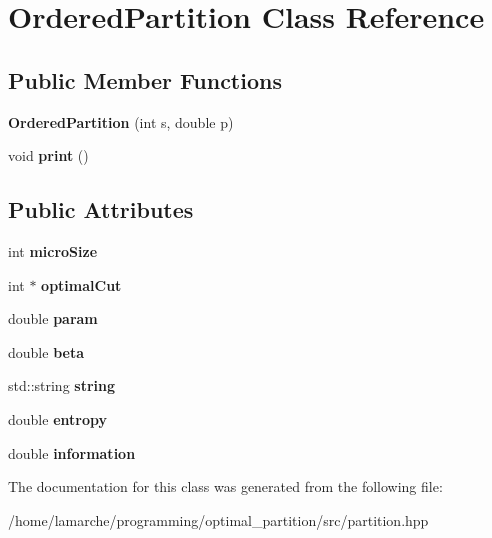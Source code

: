 \hypertarget{classOrderedPartition}{\section{Ordered\-Partition Class Reference}
\label{classOrderedPartition}
}
\subsection*{Public Member Functions}
\begin{DoxyCompactItemize}
\item 
\hypertarget{classOrderedPartition_aabf4e3ee7ddd8279efd1d30f13844dbf}{{\bfseries Ordered\-Partition} (int s, double p)}\label{classOrderedPartition_aabf4e3ee7ddd8279efd1d30f13844dbf}

\item 
\hypertarget{classOrderedPartition_ad62349b410a52274043a328dafb13342}{void {\bfseries print} ()}\label{classOrderedPartition_ad62349b410a52274043a328dafb13342}

\end{DoxyCompactItemize}
\subsection*{Public Attributes}
\begin{DoxyCompactItemize}
\item 
\hypertarget{classOrderedPartition_ac4e60b2ef3d286b496d3274f153ff610}{int {\bfseries micro\-Size}}\label{classOrderedPartition_ac4e60b2ef3d286b496d3274f153ff610}

\item 
\hypertarget{classOrderedPartition_aa87bf05471b9071a94cf53226552f436}{int $\ast$ {\bfseries optimal\-Cut}}\label{classOrderedPartition_aa87bf05471b9071a94cf53226552f436}

\item 
\hypertarget{classOrderedPartition_a8c7fef058b25165c69652e8c78d9bd7e}{double {\bfseries param}}\label{classOrderedPartition_a8c7fef058b25165c69652e8c78d9bd7e}

\item 
\hypertarget{classOrderedPartition_a68c0b17fa5a9fc525af12b9960874ae7}{double {\bfseries beta}}\label{classOrderedPartition_a68c0b17fa5a9fc525af12b9960874ae7}

\item 
\hypertarget{classOrderedPartition_a6508f965f7e829e361c5d73acccce6eb}{std\-::string {\bfseries string}}\label{classOrderedPartition_a6508f965f7e829e361c5d73acccce6eb}

\item 
\hypertarget{classOrderedPartition_acc541302636a852fbb51c876277595a9}{double {\bfseries entropy}}\label{classOrderedPartition_acc541302636a852fbb51c876277595a9}

\item 
\hypertarget{classOrderedPartition_a414f6978e006ba9d647e48ceef9143b8}{double {\bfseries information}}\label{classOrderedPartition_a414f6978e006ba9d647e48ceef9143b8}

\end{DoxyCompactItemize}


The documentation for this class was generated from the following file\-:\begin{DoxyCompactItemize}
\item 
/home/lamarche/programming/optimal\-\_\-partition/src/partition.\-hpp\end{DoxyCompactItemize}
